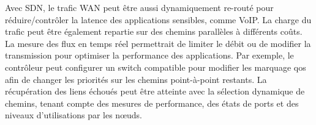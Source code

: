 


Avec SDN, le trafic WAN peut être aussi dynamiquement re-routé pour réduire/contrôler la latence des applications sensibles, comme VoIP. La charge du trafic peut être également repartie sur des chemins parallèles à différents coûts.
La mesure des flux en temps réel permettrait de limiter le débit ou de modifier la transmission pour optimiser la performance des applications. Par exemple, le contrôleur peut configurer un switch compatible pour modifier les marquage \gls{qos} afin de changer les priorités sur les chemins point-à-point restants.
La récupération des liens échoués peut être atteinte avec la sélection dynamique de chemins, tenant compte des mesures de performance, des états de ports et des niveaux d'utilisations par les nœuds.

